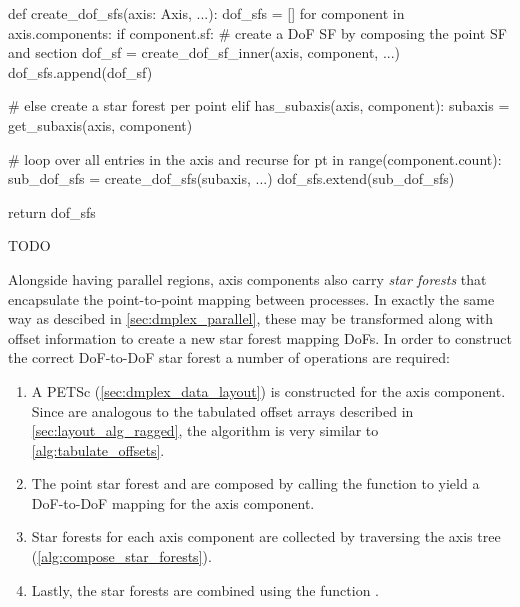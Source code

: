 \documentclass[thesis]{subfiles}
\begin{document}
\begin{algorithm}
  \begin{center}
    \begin{minipage}{.9\textwidth}
      \begin{pyalg2}
        def create_dof_sfs(axis: Axis, ...):
          dof_sfs = []
          for component in axis.components:
            if component.sf:
              # create a DoF SF by composing the point SF and section
              dof_sf = create_dof_sf_inner(axis, component, ...)
              dof_sfs.append(dof_sf)

            # else create a star forest per point
            elif has_subaxis(axis, component):
              subaxis = get_subaxis(axis, component)

              # loop over all entries in the axis and recurse
              for pt in range(component.count):
                sub_dof_sfs = create_dof_sfs(subaxis, ...)
                dof_sfs.extend(sub_dof_sfs)

          return dof_sfs
      \end{pyalg2}
    \end{minipage}
  \end{center}

  \caption{
    TODO
  }
  \label{alg:compose_star_forests}
\end{algorithm}

Alongside having parallel regions, axis components also carry \textit{star forests} that encapsulate the point-to-point mapping between processes.
In exactly the same way as descibed in \cref{sec:dmplex_parallel}, these may be transformed along with offset information to create a new star forest mapping DoFs.
In order to construct the correct DoF-to-DoF star forest a number of operations are required:

\begin{enumerate}
  \item
    A PETSc  (\cref{sec:dmplex_data_layout}) is constructed for the axis component.
    Since  are analogous to the tabulated offset arrays described in \cref{sec:layout_alg_ragged}, the algorithm is very similar to \cref{alg:tabulate_offsets}.

  \item
    The point star forest and  are composed by calling the function  to yield a DoF-to-DoF mapping for the axis component.

  \item
    Star forests for each axis component are collected by traversing the axis tree (\cref{alg:compose_star_forests}).

  \item
    Lastly, the star forests are combined using the function .
\end{enumerate}
\end{document}

